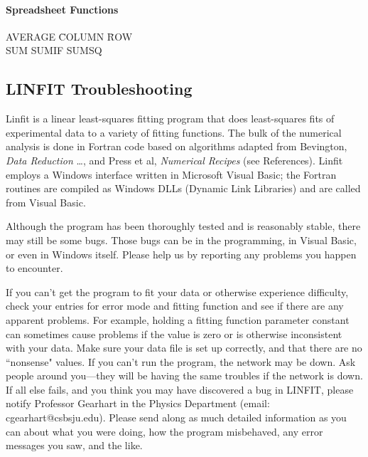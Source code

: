 \paragraph*{Spreadsheet Functions}
\begin{tabbing}	
AVERAGE  \hspace{1in}  \=  COLUMN \hspace{1in}  \=  ROW  \\
SUM     \>  SUMIF  \>  SUMSQ \\
\end{tabbing}

\subsection*{LINFIT Troubleshooting}

Linfit is a linear least-squares fitting program that does
least-squares fits of experimental data to a variety of fitting
functions.  The bulk of the numerical analysis is done in Fortran code
based on algorithms adapted from Bevington, {\em Data Reduction}
\ldots,
and Press et al, {\em Numerical Recipes} (see References).  Linfit
employs
a Windows interface written in Microsoft Visual Basic; the Fortran
routines are compiled as Windows DLLs (Dynamic Link Libraries) and are
called from Visual Basic.

Although the program has been thoroughly tested and is reasonably
stable, there may still be some bugs.  Those bugs can be in the
programming, in Visual Basic, or even in Windows itself.  Please help
us by reporting any problems you happen to encounter.

If you can't get the program to fit your data or otherwise experience
difficulty, check your entries for error mode and fitting function
and see if there are any apparent problems.  For example, holding
a fitting function parameter constant can sometimes cause problems
if the value is zero or is otherwise inconsistent with your data.
Make sure your data file
is set up correctly, and that there are no ``nonsense" values.  If you
 can't run the program, the network may be down.  Ask people around
you---they will be having the same troubles if the network is down.  If all
else fails, and you think you may have discovered a bug in LINFIT,
please notify Professor Gearhart in the Physics Department (email:
cgearhart@csbsju.edu).  Please send along as much detailed information
as you can about what you were doing, how the program misbehaved, any
error messages you saw, and the like.





